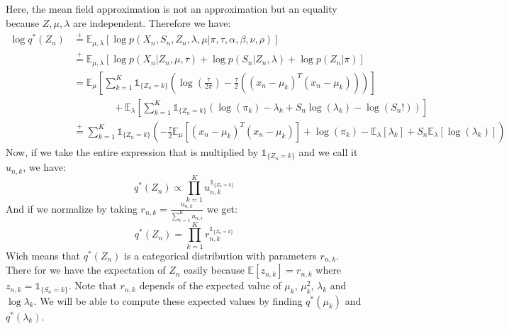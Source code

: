 \documentclass{article}
\begin{document}
Here, the mean field approximation is not an approximation but an equality because $Z, \mu, \lambda$ are independent. Therefore we have:
\begin{equation}
  \begin{split}
    \log q^*(Z_n) & \overset{+}{=} \mathbb{E}_{\mu,\lambda}[\log p(X_n,S_n,Z_n,\lambda,\mu|\pi,\tau,\alpha,\beta,\nu,\rho)]                                                                                                                                                       \\
                  & \overset{+}{=} \mathbb{E}_{\mu,\lambda}[\log p(X_n|Z_n,\mu,\tau) + \log p(S_n|Z_n,\lambda) + \log p(Z_n|\pi)]                                                                                                                                                 \\
                  & = \mathbb{E}_{\mu}\left[\sum_{k=1}^{K}\mathbb{1}_{\{Z_n = k\}}\left(\log \left(\frac{\tau}{2\pi}\right) -\frac{\tau}{2}\left((x_n - \mu_k)^T(x_n - \mu_k)\right)\right)\right]                                                                                \\
                  & \qquad\qquad + \mathbb{E}_{\lambda}\left[\sum_{k=1}^{K}\mathbb{1}_{\{Z_n = k\}}\left(\log(\pi_k) -\lambda_k + S_n\log(\lambda_k) - \log(S_n!)\right)\right]                                                                                                   \\
                  & \overset{+}{=} \sum_{k=1}^{K}\mathbb{1}_{\{Z_n = k\}}\left(- \frac{\tau}{2}\mathbb{E}_{\mu}\left[(x_n - \mu_k)^T(x_n - \mu_k)\right] + \log(\pi_k) - \mathbb{E}_{\lambda}\left[\lambda_k\right] + S_n \mathbb{E}_{\lambda}\left[\log(\lambda_k)\right]\right)
  \end{split}
\end{equation}
Now, if we take the entire expression that is multiplied by $\mathbb{1}_{\{Z_n = k\}}$ and we call it $u_{n,k}$, we have:
\begin{equation}
  q^*(Z_n) \propto \prod_{k=1}^{K}u_{n,k}^{\mathbb{1}_{\{Z_n = k\}}}
\end{equation}
And if we normalize by taking $r_{n,k} = \frac{u_{n,k}}{\sum_{i=1}^{K}u_{n,i}}$ we get:
\begin{equation}
  q^*(Z_n) = \prod_{k=1}^{K}r_{n,k}^{\mathbb{1}_{\{Z_n = k\}}}
\end{equation}
Wich means that $q^*(Z_n)$ is a categorical distribution with parameters $r_{n,k}$. There for we have the expectation of $Z_n$ easily because $\mathbb{E}[z_{n,k}] = r_{n,k}$ where $z_{n,k} = \mathbb{1}_{\{S_n = k\}}$. Note that $r_{n,k}$ depends of the expected value of $\mu_k$, $\mu_k^2$, $\lambda_k$ and $\log \lambda_k$. We will be able to compute these expected values by finding $q^*(\mu_k)$ and $q^*(\lambda_k)$.
\end{document}

